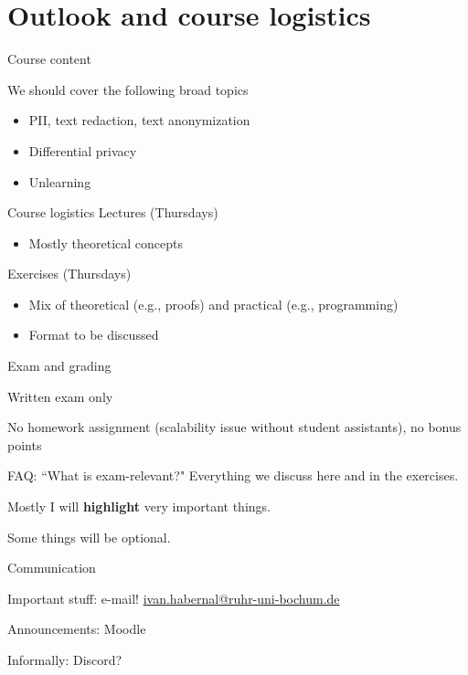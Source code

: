 \documentclass[12pt,aspectratio=169,handout]{beamer}
\begin{document}
\section{Outlook and course logistics}

\begin{frame}{Course content}

We should cover the following broad topics

\begin{itemize}
\item PII, text redaction, text anonymization
\item Differential privacy
\item Unlearning
\end{itemize}


\end{frame}

\begin{frame}{Course logistics}
Lectures (Thursdays)

\begin{itemize}
\item Mostly theoretical concepts
\end{itemize}

Exercises (Thursdays)
\begin{itemize}
\item Mix of theoretical (e.g., proofs) and practical (e.g., programming)
\item Format to be discussed
\end{itemize}
\end{frame}


\begin{frame}{Exam and grading}

Written exam only

No homework assignment (scalability issue without student assistants), no bonus points

\begin{block}{FAQ: ``What is exam-relevant?"}
Everything we discuss here and in the exercises.

Mostly I will \textbf{highlight} very important things.

Some things will be optional.
\end{block}

\end{frame}


\begin{frame}{Communication}

Important stuff: e-mail! \url{ivan.habernal@ruhr-uni-bochum.de}

Announcements: Moodle

Informally: Discord?

\end{frame}
\end{document}
